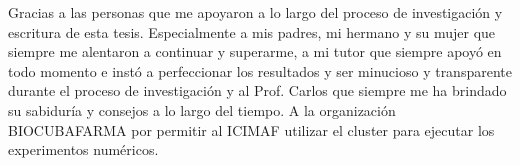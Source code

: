 \begin{acknowledgements}

Gracias a las personas que me apoyaron a lo largo del proceso de investigación y escritura de esta tesis. Especialmente a mis padres, mi hermano y su mujer que
  siempre me alentaron a continuar y superarme, a mi tutor que siempre apoyó en todo momento e instó a perfeccionar los resultados y ser minucioso y transparente
  durante el proceso de investigación y al Prof. Carlos que siempre me ha brindado su sabiduría y consejos a lo largo del tiempo. A la organización BIOCUBAFARMA por permitir al ICIMAF utilizar el cluster para ejecutar los experimentos numéricos.

\end{acknowledgements}